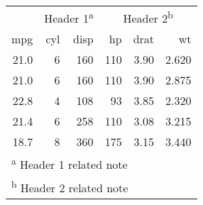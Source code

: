 
\begin{tabular}{rrrrrr}
\toprule
\multicolumn{1}{c}{} & \multicolumn{2}{c}{Header 1\textsuperscript{a}} & \multicolumn{3}{c}{Header 2\textsuperscript{b}} \\
\cmidrule(l{2pt}r{2pt}){2-3} \cmidrule(l{2pt}r{2pt}){4-6}
mpg & cyl & disp & hp & drat & wt\\
\midrule
21.0 & 6 & 160 & 110 & 3.90 & 2.620\\
21.0 & 6 & 160 & 110 & 3.90 & 2.875\\
22.8 & 4 & 108 & 93 & 3.85 & 2.320\\
21.4 & 6 & 258 & 110 & 3.08 & 3.215\\
18.7 & 8 & 360 & 175 & 3.15 & 3.440\\
\bottomrule
\multicolumn{6}{l}{\textsuperscript{a} Header 1 related note}\\
\multicolumn{6}{l}{\textsuperscript{b} Header 2 related note}\\
\end{tabular}

